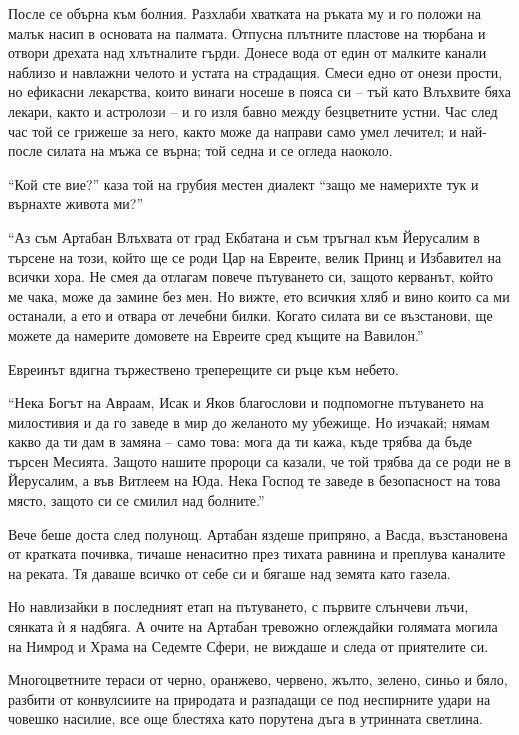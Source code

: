 \documentclass[oneside,10pt]{memoir}
\begin{document}
После се обърна към болния. Разхлаби хватката на ръката му и го положи на малък
насип в основата на палмата. Отпусна плътните пластове на тюрбана и отвори
дрехата над хлътналите гърди. Донесе вода от един от малките канали наблизо и
навлажни челото и устата на страдащия. Смеси едно от онези прости, но ефикасни
лекарства, които винаги носеше в пояса си -- тъй като Влъхвите бяха лекари,
както и астролози -- и го изля бавно между безцветните устни. Час след час той
се грижеше за него, както може да направи само умел лечител; и най-после силата
на мъжа се върна; той седна и се огледа наоколо.

``Кой сте вие?'' каза той на грубия местен диалект ``защо ме намерихте тук и
върнахте живота ми?''

``Аз съм Артабан Влъхвата от град Екбатана и съм тръгнал към Йерусалим в търсене
на този, който ще се роди Цар на Евреите, велик Принц и Избавител на всички
хора. Не смея да отлагам повече пътуването си, защото керванът, който ме чака,
може да замине без мен. Но вижте, ето всичкия хляб и вино които са ми останали,
а ето и отвара от лечебни билки. Когато силата ви се възстанови, ще можете да
намерите домовете на Евреите сред къщите на Вавилон.''

Евреинът вдигна тържествено треперещите си ръце към небето.

``Нека Богът на Авраам, Исак и Яков благослови и подпомогне пътуването на
милостивия и да го заведе в мир до желаното му убежище. Но изчакай; нямам какво
да ти дам в замяна -- само това: мога да ти кажа, къде трябва да бъде търсен
Месията. Защото нашите пророци са казали, че той трябва да се роди не в
Йерусалим, а във Витлеем на Юда. Нека Господ те заведе в безопасност на това
място, защото си се смилил над болните.''

Вече беше доста след полунощ. Артабан яздеше припряно, а Васда, възстановена от
кратката почивка, тичаше ненаситно през тихата равнина и преплува каналите на
реката. Тя даваше всичко от себе си и бягаше над земята като газела.

Но навлизайки в последният етап на пътуването, с първите слънчеви лъчи, сянката
ѝ я надбяга. А очите на Артабан тревожно оглеждайки голямата могила на Нимрод и
Храма на Седемте Сфери, не виждаше и следа от приятелите си.

Многоцветните тераси от черно, оранжево, червено, жълто, зелено, синьо и бяло,
разбити от конвулсиите на природата и разпадащи се под неспирните удари на
човешко насилие, все още блестяха като порутена дъга в утринната светлина.
\end{document}
